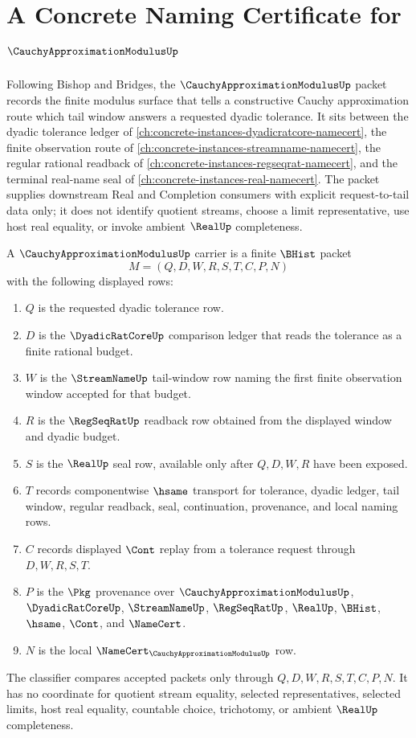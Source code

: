 \chapter{A Concrete Naming Certificate for $\CauchyApproximationModulusUp$}
\label{ch:concrete-instances-cauchy-approximation-modulus-namecert}

Following Bishop and Bridges, the $\CauchyApproximationModulusUp$ packet records the finite modulus surface that tells a constructive Cauchy approximation route which tail window answers a requested dyadic tolerance. It sits between the dyadic tolerance ledger of \autoref{ch:concrete-instances-dyadicratcore-namecert}, the finite observation route of \autoref{ch:concrete-instances-streamname-namecert}, the regular rational readback of \autoref{ch:concrete-instances-regseqrat-namecert}, and the terminal real-name seal of \autoref{ch:concrete-instances-real-namecert}. The packet supplies downstream Real and Completion consumers with explicit request-to-tail data only; it does not identify quotient streams, choose a limit representative, use host real equality, or invoke ambient $\RealUp$ completeness.

\begin{definition}\label{def:cauchy-approximation-modulus-carrier}
A $\CauchyApproximationModulusUp$ carrier is a finite $\BHist$ packet
$$
M=(Q,D,W,R,S,T,C,P,N)
$$
with the following displayed rows:
\begin{enumerate}
\item $Q$ is the requested dyadic tolerance row.
\item $D$ is the $\DyadicRatCoreUp$ comparison ledger that reads the tolerance as a finite rational budget.
\item $W$ is the $\StreamNameUp$ tail-window row naming the first finite observation window accepted for that budget.
\item $R$ is the $\RegSeqRatUp$ readback row obtained from the displayed window and dyadic budget.
\item $S$ is the $\RealUp$ seal row, available only after $Q,D,W,R$ have been exposed.
\item $T$ records componentwise $\hsame$ transport for tolerance, dyadic ledger, tail window, regular readback, seal, continuation, provenance, and local naming rows.
\item $C$ records displayed $\Cont$ replay from a tolerance request through $D,W,R,S,T$.
\item $P$ is the $\Pkg$ provenance over $\CauchyApproximationModulusUp$, $\DyadicRatCoreUp$, $\StreamNameUp$, $\RegSeqRatUp$, $\RealUp$, $\BHist$, $\hsame$, $\Cont$, and $\NameCert$.
\item $N$ is the local $\NameCert_{\CauchyApproximationModulusUp}$ row.
\end{enumerate}
The classifier compares accepted packets only through $Q,D,W,R,S,T,C,P,N$. It has no coordinate for quotient stream equality, selected representatives, selected limits, host real equality, countable choice, trichotomy, or ambient $\RealUp$ completeness.
\end{definition}

